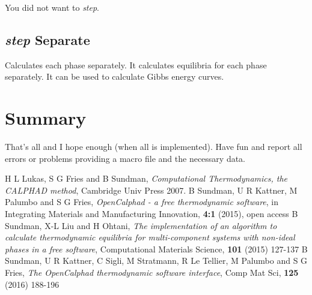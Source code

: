 \documentclass[12pt]{article}
\begin{document}
You did not want to {\em step}.

\subsection{{\em step} Separate}

Calculates each phase separately.  It calculates equilibria for each
phase separately.  It can be used to calculate Gibbs energy curves.


\section{Summary }

That's all and I hope enough (when all is implemented).  Have fun and
report all errors or problems providing a macro file and the necessary
data.

\begin{thebibliography}{77zzz}
 H L Lukas, S G Fries and B Sundman, {\em
  Computational Thermodynamics, the CALPHAD method}, Cambridge Univ
  Press 2007.
 B Sundman, U R Kattner, M Palumbo and S G
  Fries, {\em OpenCalphad - a free thermodynamic software}, in
  Integrating Materials and Manufacturing Innovation, {\bf 4:1}
  (2015), open access
 B Sundman, X-L Liu and H Ohtani, {\em The
  implementation of an algorithm to calculate thermodynamic equilibria
  for multi-component systems with non-ideal phases in a free
  software}, Computational Materials Science, {\bf 101} (2015) 127-137
 B Sundman, U R Kattner, C Sigli, M Stratmann, R
  Le Tellier, M Palumbo and S G Fries, {\em The OpenCalphad
    thermodynamic software interface}, Comp Mat Sci, {\bf 125} (2016)
  188-196
\end{thebibliography}
\end{document}
